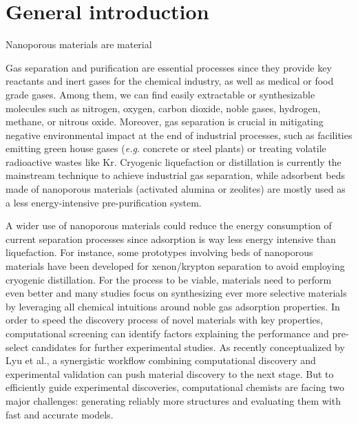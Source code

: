 
\chapter*{General introduction}

Nanoporous materials are material 


Gas separation and purification are essential processes since they provide key reactants and inert gases for the chemical industry, as well as medical or food grade gases. Among them, we can find easily extractable or synthesizable molecules such as nitrogen, oxygen, carbon dioxide, noble gases, hydrogen, methane, or nitrous oxide. Moreover, gas separation is crucial in mitigating negative environmental impact at the end of industrial processes, such as facilities emitting green house gases (\emph{e.g.} concrete or steel plants) or treating volatile radioactive wastes like Kr. Cryogenic liquefaction or distillation is currently the mainstream technique to achieve industrial gas separation, while adsorbent beds made of nanoporous materials (activated alumina or zeolites) are mostly used as a less energy-intensive pre-purification system.\cite{kerry2007industrial}

A wider use of nanoporous materials could reduce the energy consumption of current separation processes since adsorption is way less energy intensive than liquefaction.\cite{national2019research} For instance, some prototypes involving beds of nanoporous materials have been developed for xenon/krypton separation to avoid employing cryogenic distillation.\cite{Banerjee2018} For the process to be viable, materials need to perform even better and many studies focus on synthesizing ever more selective materials by leveraging all chemical intuitions around noble gas adsorption properties.\cite{Chen_2014, Li_2019, Pei_2022} In order to speed the discovery process of novel materials with key properties, computational screening can identify factors explaining the performance and pre-select candidates for further experimental studies. As recently conceptualized by Lyu et al., a synergistic workflow combining computational discovery and experimental validation can push material discovery to the next stage.\cite{Lyu_2020, Jablonka_2022} But to efficiently guide experimental discoveries, computational chemists are facing two major challenges: generating reliably more structures and evaluating them with fast and accurate models.


